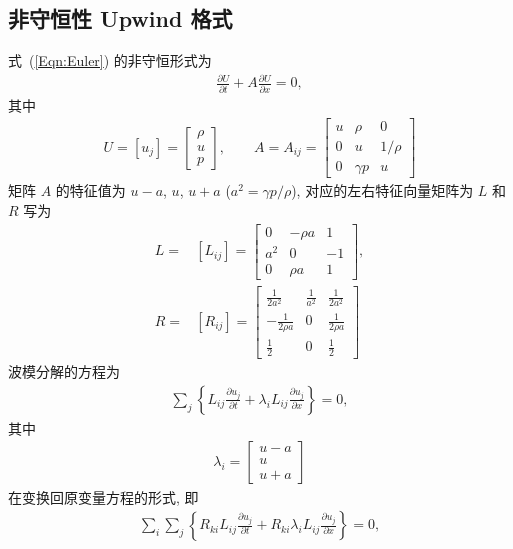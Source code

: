 \documentclass[10.5pt
]{article}
\begin{document}
\subsection{非守恒性 Upwind 格式}
式~(\ref{Eqn:Euler}) 的非守恒形式为
\begin{align}
\frac{\partial U}{\partial t} + A \frac{\partial U}{\partial x} = 0,
\end{align}
其中
\begin{align}
U = [u_j] = \left[\begin{array}{c}\rho\\ u\\ p\end{array}\right], \qquad A = A_{ij} = \left[\begin{array}{ccc}u & \rho & 0\\
0 & u & 1/\rho\\ 0 & \gamma p & u\end{array}\right]
\end{align}
矩阵 $A$ 的特征值为 $u-a$, $u$, $u+a$ ($a^2 = \gamma p/\rho$), 对应的左右特征向量矩阵为 $L$ 和 $R$ 写为
\begin{align}
L =& [L_{ij}] = \left[\begin{array}{ccc}0 & -\rho a & 1\\ a^2 & 0 & -1\\ 0 & \rho a & 1\end{array}\right],
\\
R =& [R_{ij}] = \left[\begin{array}{ccc}\frac{1}{2a^2} & \frac{1}{a^2} & \frac{1}{2a^2}\\
-\frac{1}{2\rho a} & 0 & \frac{1}{2\rho a}\\ \frac{1}{2} & 0 & \frac{1}{2}\end{array}\right]
\end{align}
波模分解的方程为
\begin{align}
\sum_j \left\{L_{ij} \frac{\partial u_j}{\partial t} + \lambda_i L_{ij} \frac{\partial u_j}{\partial
x}\right\} = 0,
\end{align}
其中
\begin{align}
\lambda_i =
\left[\begin{array}{c}u-a \\ u\\ u+a\end{array}\right]
\end{align}
在变换回原变量方程的形式, 即
\begin{align}
\sum_i \sum_j \left\{R_{ki} L_{ij} \frac{\partial u_j}{\partial t} + R_{ki} \lambda_i L_{ij}
\frac{\partial u_j}{\partial x}\right\} = 0,
\end{align}
\end{document}
